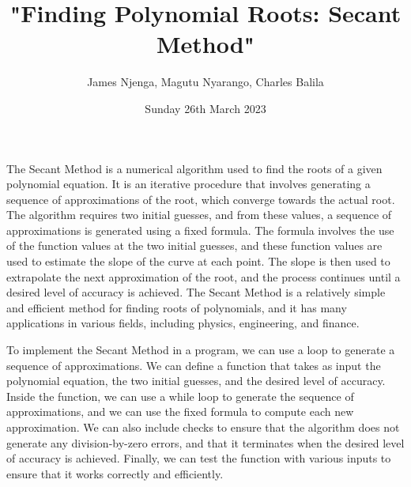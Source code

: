 \documentclass{article}
\title{"Finding Polynomial Roots: Secant Method"}
\author{James Njenga, Magutu Nyarango, Charles Balila}
\date{Sunday 26th March 2023}
\begin{document}
\maketitle

The Secant Method is a numerical algorithm used to find the roots of a given polynomial equation. It is an iterative procedure that involves generating a sequence of approximations of the root, which converge towards the actual root. The algorithm requires two initial guesses, and from these values, a sequence of approximations is generated using a fixed formula. The formula involves the use of the function values at the two initial guesses, and these function values are used to estimate the slope of the curve at each point. The slope is then used to extrapolate the next approximation of the root, and the process continues until a desired level of accuracy is achieved. The Secant Method is a relatively simple and efficient method for finding roots of polynomials, and it has many applications in various fields, including physics, engineering, and finance.

To implement the Secant Method in a program, we can use a loop to generate a sequence of approximations. We can define a function that takes as input the polynomial equation, the two initial guesses, and the desired level of accuracy. Inside the function, we can use a while loop to generate the sequence of approximations, and we can use the fixed formula to compute each new approximation. We can also include checks to ensure that the algorithm does not generate any division-by-zero errors, and that it terminates when the desired level of accuracy is achieved. Finally, we can test the function with various inputs to ensure that it works correctly and efficiently.
\end{document}
